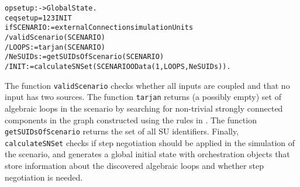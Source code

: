 \small
\begin{alltt}
op setup : -> GlobalState .
ceq setup = \char123INIT
  if SCENARIO := externalConnection simulationUnits
  / validScenario(SCENARIO)
  / LOOPS := tarjan(SCENARIO)
  / NeSUIDs := getSUIDsOfScenario(SCENARIO)
  / INIT := calculateSNSet(SCENARIO OData(1,LOOPS, NeSUIDs)) .
\end{alltt}
\normalsize

\noindent The function \texttt{validScenario} checks whether all inputs are coupled and that no input has two sources.   
The function \texttt{tarjan} returns (a possibly empty) set  of algebraic loops in the scenario by searching for non-trivial strongly connected components in
the graph constructed using the rules  in \cite{Gomes2019c}.   
The function \texttt{getSUIDsOfScenario} returns  the set of all SU
identifiers. Finally, \texttt{calculateSNSet} checks if step negotiation 
should be applied in the simulation of the scenario, and generates a
global initial state with orchestration objects that store information
about the discovered algebraic loops and whether step negotiation is
needed.